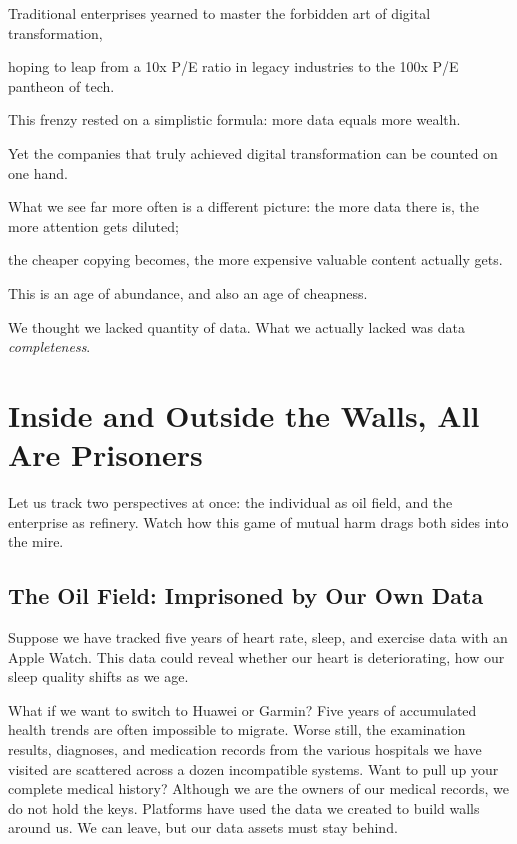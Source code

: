 Traditional enterprises yearned to master the forbidden art of digital transformation,

hoping to leap from a 10x P/E ratio in legacy industries to the 100x P/E pantheon of tech.

This frenzy rested on a simplistic formula: more data equals more wealth.

Yet the companies that truly achieved digital transformation can be counted on one hand.

\vspace{1em}

What we see far more often is a different picture:
the more data there is, the more attention gets diluted;

the cheaper copying becomes, the more expensive valuable content actually gets.

\begin{importantbox}
This is an age of abundance, and also an age of cheapness.

We thought we lacked quantity of data. What we actually lacked was data \emph{completeness}.
\end{importantbox}

\newpage
\section{Inside and Outside the Walls, All Are Prisoners}
Let us track two perspectives at once: the individual as oil field, and the enterprise as refinery. Watch how this game of mutual harm drags both sides into the mire.

\subsection{The Oil Field: Imprisoned by Our Own Data}

Suppose we have tracked five years of heart rate, sleep, and exercise data with an Apple Watch. This data could reveal whether our heart is deteriorating, how our sleep quality shifts as we age.

\vspace{1em}

What if we want to switch to Huawei or Garmin? Five years of accumulated health trends are often impossible to migrate.
Worse still, the examination results, diagnoses, and medication records from the various hospitals we have visited are scattered across a dozen incompatible systems. Want to pull up your complete medical history? Although we are the owners of our medical records, we do not hold the keys. Platforms have used the data we created to build walls around us. We can leave, but our data assets must stay behind.

